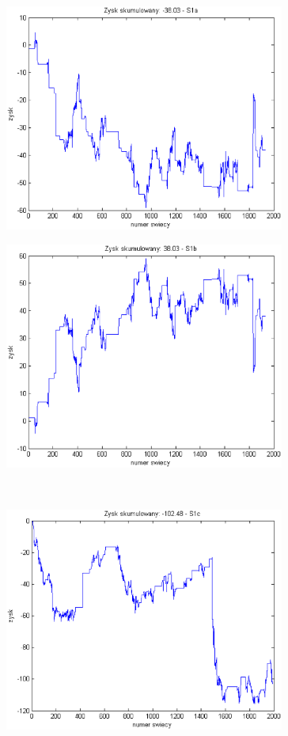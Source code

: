 \documentclass{tewiart}
\begin{document}
\FloatBarrier
\begin{figure}[h]
\centering
\begin{minipage}{.49\linewidth}
\centering
\includegraphics[width=0.82\textwidth]{images/fcornS1a.eps}
\label{jedno}
\end{minipage}
\begin{minipage}{.49\linewidth}
\centering
\includegraphics[width=0.82\textwidth]{images/fcornS1b.eps}
\label{dwu}
\end{minipage}
\\
\begin{minipage}{.49\linewidth}
\centering
\includegraphics[width=0.82\textwidth]{images/fcornS1c.eps}

\end{minipage}
\end{figure}
\end{document}
